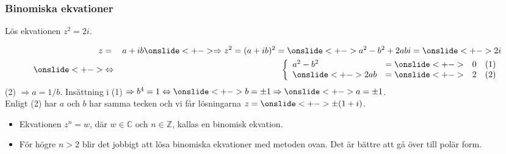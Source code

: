 \documentclass[slidestop,blue,handout,9pt]{beamer}
\begin{document}
\begin{frame}
\frametitle{Binomiska ekvationer}


\begin{exempel}
Lös ekvationen $z^{2}=2i$.
\onslide<+->
\begin{losning}
\begin{eqnarray*}
z&=&a+ib \onslide<+-> \Rightarrow z^2=(a+ib)^{2}=\onslide<+->
 a^{2}-b^{2}+2abi=\onslide<+-> 2i\\
\onslide<+->
&\Leftrightarrow& \left\{ 
\begin{array}{llll}
a^{2}-b^{2} & =\onslide<+->
 & 0 & (1) \\
\onslide<+->
 2ab & = \onslide<+->
& 2 & (2)
\end{array}
\right.
\end{eqnarray*}
\newline
\onslide<+->
(2) $\Rightarrow a=1/b$. \onslide<+-> Insättning i (1) $\Rightarrow
b^{4}=1\Leftrightarrow \onslide<+->
b=\pm 1\Rightarrow \onslide<+->
a=\pm 1$. \\
\onslide<+->
Enligt (2) har $a$ och $b$ har samma tecken och vi får lösningarna $z=\onslide<+->
\pm (1+i)$.
\end{losning}
\end{exempel}
\begin{itemize}
\item Ekvationen $z^{n}=w$, där $w \in \mathbb{C}$ och $n\in \mathbb{Z}$, kallas en
\alert{binomisk ekvation}.
\item För högre $n>2$ blir det jobbigt att lösa binomiska
 ekvationer med metoden ovan. Det är bättre att gå över till polär form.
\end{itemize}

\end{frame}
\end{document}
